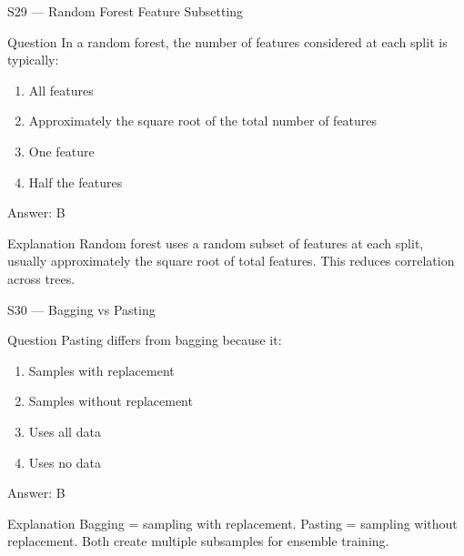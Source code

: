 \documentclass[aspectratio=169,8pt]{beamer}
\begin{document}
	\begin{frame}{S29 --- Random Forest Feature Subsetting}
		\begin{block}{Question}
			In a random forest, the number of features considered at each split is typically:
			\begin{enumerate}
				\item All features
				\item Approximately the square root of the total number of features
				\item One feature
				\item Half the features
			\end{enumerate}
		\end{block}
		\begin{exampleblock}{Answer: B}\end{exampleblock}
		\begin{block}{Explanation}
			Random forest uses a random subset of features at each split, usually approximately the square root of total features. This reduces correlation across trees.
		\end{block}
	\end{frame}
	
	\begin{frame}{S30 --- Bagging vs Pasting}
		\begin{block}{Question}
			Pasting differs from bagging because it:
			\begin{enumerate}
				\item Samples with replacement
				\item Samples without replacement
				\item Uses all data
				\item Uses no data
			\end{enumerate}
		\end{block}
		\begin{exampleblock}{Answer: B}\end{exampleblock}
		\begin{block}{Explanation}
			Bagging = sampling with replacement. Pasting = sampling without replacement. Both create multiple subsamples for ensemble training.
		\end{block}
	\end{frame}
	
\end{document}
